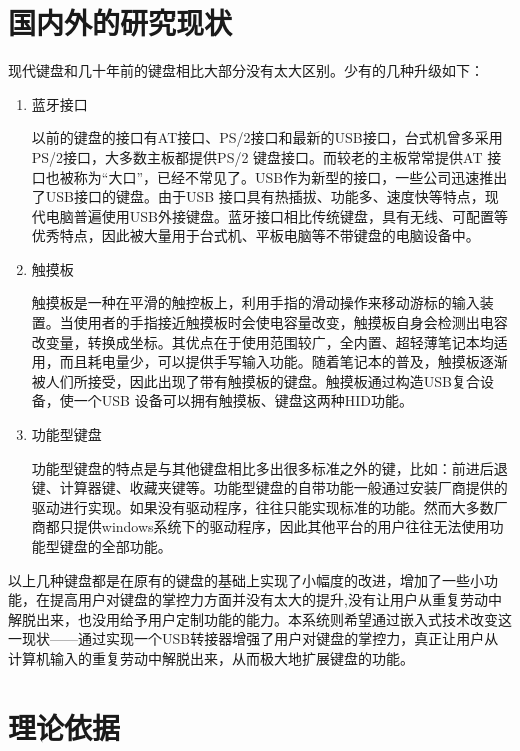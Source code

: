 \section{国内外的研究现状}
现代键盘和几十年前的键盘相比大部分没有太大区别。少有的几种升级如下：
\begin{enumerate}
\item 蓝牙接口

以前的键盘的接口有AT接口、PS/2接口和最新的USB接口，台式机曾多采用PS/2接口，大多数主板都提供PS/2 键盘接口。而较老的主板常常提供AT 接口也被称为“大口”，已经不常见了。USB作为新型的接口，一些公司迅速推出了USB接口的键盘。由于USB 接口具有热插拔、功能多、速度快等特点，现代电脑普遍使用USB外接键盘。蓝牙接口相比传统键盘，具有无线、可配置等优秀特点，因此被大量用于台式机、平板电脑等不带键盘的电脑设备中。



\item 触摸板

触摸板是一种在平滑的触控板上，利用手指的滑动操作来移动游标的输入装置。当使用者的手指接近触摸板时会使电容量改变，触摸板自身会检测出电容改变量，转换成坐标。其优点在于使用范围较广，全内置、超轻薄笔记本均适用，而且耗电量少，可以提供手写输入功能。随着笔记本的普及，触摸板逐渐被人们所接受，因此出现了带有触摸板的键盘。触摸板通过构造USB复合设备，使一个USB 设备可以拥有触摸板、键盘这两种\gls{HID}功能。

\item 功能型键盘

功能型键盘的特点是与其他键盘相比多出很多标准之外的键，比如：前进后退键、计算器键、收藏夹键等。功能型键盘的自带功能一般通过安装厂商提供的驱动进行实现。如果没有驱动程序，往往只能实现标准的功能。然而大多数厂商都只提供windows系统下的驱动程序，因此其他平台的用户往往无法使用功能型键盘的全部功能。


\end{enumerate}

以上几种键盘都是在原有的键盘的基础上实现了小幅度的改进，增加了一些小功能，在提高用户对键盘的掌控力方面并没有太大的提升,没有让用户从重复劳动中解脱出来，也没用给予用户定制功能的能力。本系统则希望通过嵌入式技术改变这一现状——通过实现一个USB转接器增强了用户对键盘的掌控力，真正让用户从计算机输入的重复劳动中解脱出来，从而极大地扩展键盘的功能。

\section{理论依据}

